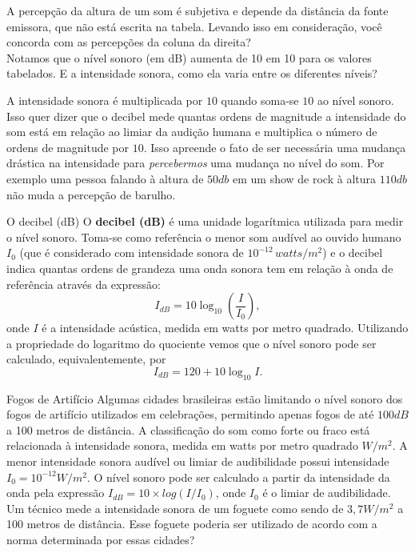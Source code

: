 \begin{reflection}
A percepção da altura de um som é subjetiva e depende da distância da fonte emissora, que não está escrita na tabela. Levando isso em consideração, você concorda com as percepções da coluna da direita?\\
Notamos que o nível sonoro (em dB) aumenta de 10 em 10 para os valores tabelados. E a intensidade sonora, como ela varia entre os diferentes níveis? 
\end{reflection}

A intensidade sonora é multiplicada por $10$ quando soma-se $10$ ao nível sonoro. Isso quer dizer que o decibel mede quantas ordens de magnitude a intensidade do som está em relação ao limiar da audição humana e multiplica o número de ordens de magnitude por $10$. Isso apreende o fato de ser necessária uma mudança drástica na intensidade para \textit{percebermos}  uma mudança no nível do som. Por exemplo uma pessoa falando à altura de $50db$ em um show de rock à altura $110db$ não muda a percepção de barulho.

\begin{observation}{O decibel (dB)}
O \textbf{decibel (dB)} é uma unidade logarítmica utilizada para medir o nível sonoro. Toma-se como referência o menor som audível ao ouvido humano $I_0$ (que é considerado com intensidade sonora de $10^{-12}\, watts/m^2$) e o decibel indica quantas ordens de grandeza uma onda sonora tem em relação à onda de referência através da expressão:
$$
I_{dB} = 10 \log_{10} \left(\frac{I}{I_0}\right),
$$
onde $I$ é a intensidade acústica, medida em watts por metro quadrado. Utilizando a propriedade do logaritmo do quociente vemos que o nível sonoro pode ser calculado, equivalentemente, por
$$
I_{dB} = 120 + 10 \log_{10} I.
$$
\end{observation}


\begin{task}{Fogos de Artifício}
Algumas cidades brasileiras estão limitando o nível sonoro dos fogos de artifício utilizados em celebrações, permitindo apenas fogos de até $100dB$ a 100 metros de distância. A classificação do som como forte ou fraco está relacionada à intensidade sonora, medida em watts por metro quadrado $W/m^2$. A menor intensidade sonora audível ou limiar de audibilidade possui intensidade $I_0 = 10^{-12} W/m^2$. O nível sonoro pode ser calculado a partir da intensidade da onda pela expressão $I_{dB} = 10 \times log(I/I_0)$, onde $I_0$ é o limiar de audibilidade. Um técnico mede a intensidade sonora de um foguete como sendo de $3{,}7 W/m^2$ a 100 metros de distância. Esse foguete poderia ser utilizado de acordo com a norma determinada por essas cidades?
\end{task}


